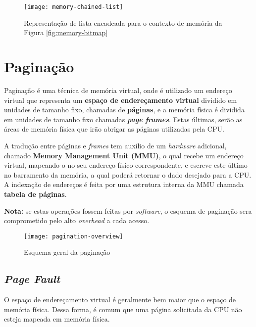 \begin{figure}[h]
  \centering
  \texttt{[image: memory-chained-list]}
  \caption{Representação de lista encadeada para o contexto de memória da Figura \ref{fig:memory-bitmap}}
  \label{fig:memory-chained-list}
\end{figure}
















\section{Paginação}
Paginação é uma técnica de memória virtual, onde é utilizado um endereço virtual que representa um \textbf{espaço de endereçamento virtual} dividido em unidades de tamanho fixo, chamadas de \textbf{páginas}, e a memória física é dividida em unidades de tamanho fixo chamadas \textbf{\textit{page frames}}. Estas últimas, serão as áreas de memória física que irão abrigar as páginas utilizadas pela CPU.

A tradução entre páginas e \textit{frames} tem auxílio de um \textit{hardware} adicional, chamado \textbf{Memory Management Unit (MMU)}, o qual recebe um endereço virtual, mapeando-o no seu endereço físico correspondente, e escreve este último no barramento da memória, a qual poderá retornar o dado desejado para a CPU. A indexação de endereços é feita por uma estrutura interna da MMU chamada \textbf{tabela de páginas}.

\textbf{Nota:} se estas operações fossem feitas por \textit{software}, o esquema de paginação sera comprometido pelo alto \textit{overhead} a cada acesso.

\begin{figure}[h]
  \centering
  \texttt{[image: pagination-overview]}
  \caption{Esquema geral da paginação}
  \label{fig:pagination}
\end{figure}










\subsection{\textit{Page Fault}}
O espaço de endereçamento virtual é geralmente bem maior que o espaço de memória física. Dessa forma, é comum que uma página solicitada da CPU não esteja mapeada em memória física.

